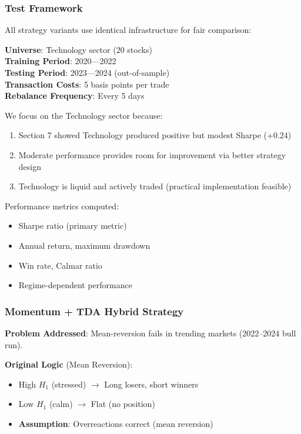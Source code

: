 \subsubsection{Test Framework}

All strategy variants use identical infrastructure for fair comparison:

\textbf{Universe}: Technology sector (20 stocks) \\
\textbf{Training Period}: 2020---2022 \\
\textbf{Testing Period}: 2023---2024 (out-of-sample) \\
\textbf{Transaction Costs}: 5 basis points per trade \\
\textbf{Rebalance Frequency}: Every 5 days

We focus on the Technology sector because:
\begin{enumerate}
\item Section 7 showed Technology produced positive but modest Sharpe (+0.24)
\item Moderate performance provides room for improvement via better strategy design
\item Technology is liquid and actively traded (practical implementation feasible)
\end{enumerate}

Performance metrics computed:
\begin{itemize}
\item Sharpe ratio (primary metric)
\item Annual return, maximum drawdown
\item Win rate, Calmar ratio
\item Regime-dependent performance
\end{itemize}

\subsubsection{Momentum + TDA Hybrid Strategy}

\textbf{Problem Addressed}: Mean-reversion fails in trending markets (2022--2024 bull run).

\textbf{Original Logic} (Mean Reversion):
\begin{itemize}
\item High $H_1$ (stressed) $\rightarrow$ Long losers, short winners
\item Low $H_1$ (calm) $\rightarrow$ Flat (no position)
\item \textbf{Assumption}: Overreactions correct (mean reversion)
\end{itemize}

